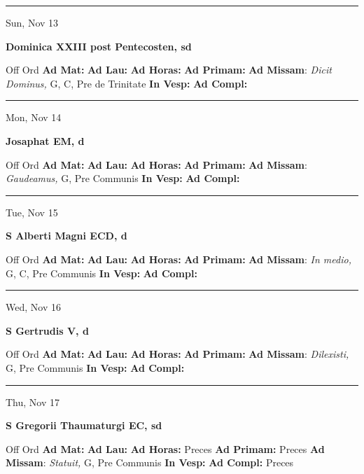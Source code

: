 \documentclass[letterpaper, 10pt]{article}
\begin{document}
\hrule
\begin{center}
Sun, Nov 13
\end{center}\textbf{ \large Dominica XXIII post Pentecosten, \textnormal{\normalsize sd}}
\begin{justify}
Off Ord
\textbf{Ad Mat: }
\textbf{Ad Lau: }
\textbf{Ad Horas: }
\textbf{Ad Primam: }
\textbf{Ad Missam}: \textit{Dicit Dominus,} G, C, Pre de Trinitate
\textbf{In Vesp: }
\textbf{Ad Compl: }\end{justify}



\hrule
\begin{center}
Mon, Nov 14
\end{center}\textbf{ \large Josaphat EM, \textnormal{\normalsize d}}
\begin{justify}
Off Ord
\textbf{Ad Mat: }
\textbf{Ad Lau: }
\textbf{Ad Horas: }
\textbf{Ad Primam: }
\textbf{Ad Missam}: \textit{Gaudeamus,} G, Pre Communis
\textbf{In Vesp: }
\textbf{Ad Compl: }\end{justify}



\hrule
\begin{center}
Tue, Nov 15
\end{center}\textbf{ \large S Alberti Magni ECD, \textnormal{\normalsize d}}
\begin{justify}
Off Ord
\textbf{Ad Mat: }
\textbf{Ad Lau: }
\textbf{Ad Horas: }
\textbf{Ad Primam: }
\textbf{Ad Missam}: \textit{In medio,} G, C, Pre Communis
\textbf{In Vesp: }
\textbf{Ad Compl: }\end{justify}



\hrule
\begin{center}
Wed, Nov 16
\end{center}\textbf{ \large S Gertrudis V, \textnormal{\normalsize d}}
\begin{justify}
Off Ord
\textbf{Ad Mat: }
\textbf{Ad Lau: }
\textbf{Ad Horas: }
\textbf{Ad Primam: }
\textbf{Ad Missam}: \textit{Dilexisti,} G, Pre Communis
\textbf{In Vesp: }
\textbf{Ad Compl: }\end{justify}



\hrule
\begin{center}
Thu, Nov 17
\end{center}\textbf{ \large S Gregorii Thaumaturgi EC, \textnormal{\normalsize sd}}
\begin{justify}
Off Ord
\textbf{Ad Mat: }
\textbf{Ad Lau: }
\textbf{Ad Horas: }Preces
\textbf{Ad Primam: }Preces
\textbf{Ad Missam}: \textit{Statuit,} G, Pre Communis
\textbf{In Vesp: }
\textbf{Ad Compl: }Preces\end{justify}
\end{document}
